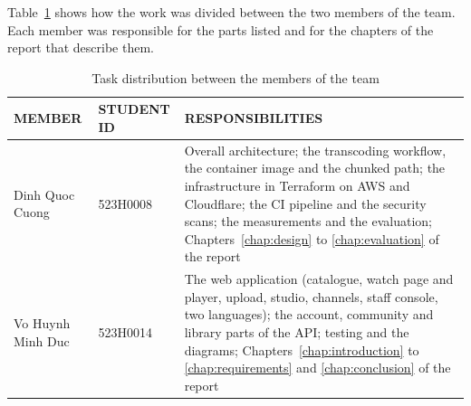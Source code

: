Table~\ref{tab:task-distribution} shows how the work was divided between the two members of the
team. Each member was responsible for the parts listed and for the chapters of the report that
describe them.

\begin{table}[H]
\centering
\caption{Task distribution between the members of the team}
\label{tab:task-distribution}
\small
\begin{tabularx}{\textwidth}{>{\raggedright\arraybackslash}p{} p{} >{\raggedright\arraybackslash}X}
\toprule
\textbf{MEMBER} & \textbf{STUDENT ID} & \textbf{RESPONSIBILITIES} \\
\midrule
Dinh Quoc Cuong & 523H0008 & Overall architecture; the transcoding workflow, the container image and the chunked path; the infrastructure in Terraform on AWS and Cloudflare; the CI pipeline and the security scans; the measurements and the evaluation; Chapters~\ref{chap:design} to \ref{chap:evaluation} of the report \\
Vo Huynh Minh Duc & 523H0014 & The web application (catalogue, watch page and player, upload, studio, channels, staff console, two languages); the account, community and library parts of the API; testing and the diagrams; Chapters~\ref{chap:introduction} to \ref{chap:requirements} and \ref{chap:conclusion} of the report \\
\bottomrule
\end{tabularx}
\end{table}
